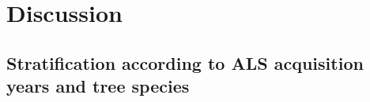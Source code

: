 
\section{Discussion}
\label{sec:regmod:Dis}

\subsection{Stratification according to ALS acquisition years and tree species}
\label{sec:strat_dis}

